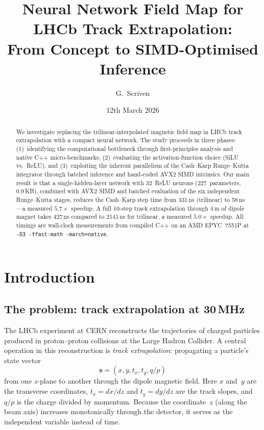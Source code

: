 \documentclass[11pt,a4paper]{article}
\title{Neural Network Field Map for LHCb Track Extrapolation:\\
       From Concept to SIMD-Optimised Inference}
\author{G.\ Scriven}
\date{12th March 2026}
\begin{document}
\maketitle

\begin{abstract}
    We investigate replacing the trilinear-interpolated magnetic field
    map in LHCb track extrapolation with a compact neural network.  The
    study proceeds in three phases: (1)~identifying the computational
    bottleneck through first-principles analysis and native C++
    micro-benchmarks, (2)~evaluating the activation-function choice
    (SiLU vs.\ ReLU), and (3)~exploiting the inherent parallelism of
    the Cash--Karp Runge--Kutta integrator through batched inference
    and hand-coded AVX2 SIMD intrinsics.  Our main result is that a
    single-hidden-layer network with 32~ReLU neurons (227~parameters,
    0.9\,KB), combined with AVX2 SIMD and batched evaluation of the six
    independent Runge--Kutta stages, reduces the Cash--Karp step time
    from 331\,ns (trilinear) to 58\,ns---a measured $5.7\times$
    speedup.  A full 10-step track extrapolation through 4\,m of dipole
    magnet takes 427\,ns compared to 2141\,ns for trilinear, a measured
    $5.0\times$ speedup.  All timings are wall-clock measurements from
    compiled C++ on an AMD EPYC~7551P at \texttt{-O3~-ffast-math
    -march=native}.
\end{abstract}

\tableofcontents
\newpage


\section{Introduction}
\label{sec:intro}

\subsection{The problem: track extrapolation at 30\,MHz}

The LHCb experiment at CERN reconstructs the trajectories of charged
particles produced in proton--proton collisions at the Large Hadron
Collider.  A central operation in this reconstruction is \emph{track
extrapolation}: propagating a particle's state vector
\begin{equation}
    \mathbf{s} = (x, y, t_x, t_y, q/p)
    \label{eq:state}
\end{equation}
from one $z$-plane to another through the dipole magnetic field.  Here
$x$ and~$y$ are the transverse coordinates, $t_x = dx/dz$ and
$t_y = dy/dz$ are the track slopes, and $q/p$ is the charge divided by
momentum.  Because the coordinate~$z$ (along the beam axis) increases
monotonically through the detector, it serves as the independent
variable instead of time.
\end{document}
